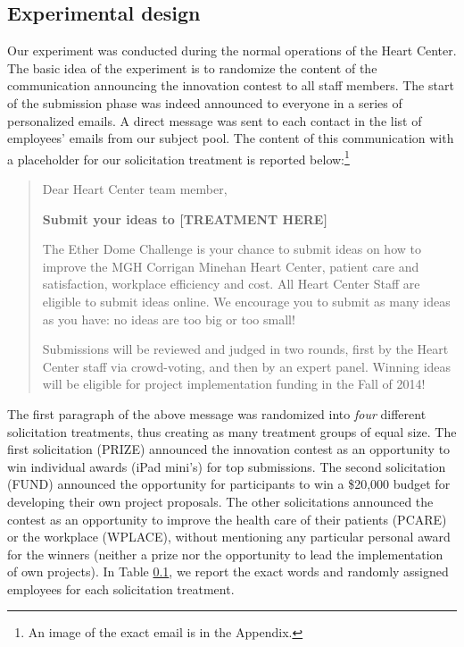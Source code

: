 \documentclass[11pt]{article}
\begin{document}
\subsection{Experimental design}\label{experimental-design}

Our experiment was conducted during the normal operations of the Heart
Center. The basic idea of the experiment is to randomize the content of
the communication announcing the innovation contest to all staff
members. The start of the submission phase was indeed announced to
everyone in a series of personalized emails. A direct message was sent
to each contact in the list of employees' emails from our subject pool.
The content of this communication with a placeholder for our
solicitation treatment is reported below:\footnote{An image of the exact
  email is in the Appendix.}

\begin{quote}
Dear Heart Center team member,

\textbf{Submit your ideas to {[}TREATMENT HERE{]}}

The Ether Dome Challenge is your chance to submit ideas on how to
improve the MGH Corrigan Minehan Heart Center, patient care and
satisfaction, workplace efficiency and cost. All Heart Center Staff are
eligible to submit ideas online. We encourage you to submit as many
ideas as you have: no ideas are too big or too small!

Submissions will be reviewed and judged in two rounds, first by the
Heart Center staff via crowd-voting, and then by an expert panel.
Winning ideas will be eligible for project implementation funding in the
Fall of 2014!
\end{quote}

The first paragraph of the above message was randomized into \emph{four}
different solicitation treatments, thus creating as many treatment
groups of equal size. The first solicitation (PRIZE) announced the
innovation contest as an opportunity to win individual awards (iPad
mini's) for top submissions. The second solicitation (FUND) announced
the opportunity for participants to win a \$20,000 budget for developing
their own project proposals. The other solicitations announced the
contest as an opportunity to improve the health care of their patients
(PCARE) or the workplace (WPLACE), without mentioning any particular
personal award for the winners (neither a prize nor the opportunity to
lead the implementation of own projects). In Table
\ref{experimental-design}, we report the exact words and randomly
assigned employees for each solicitation treatment.
\end{document}
